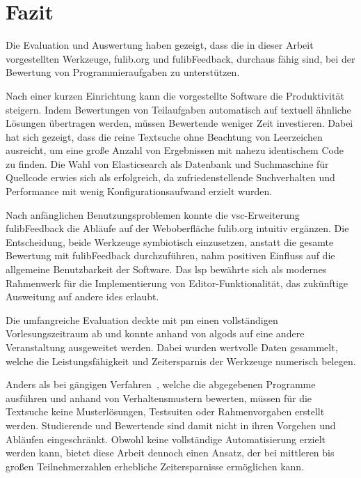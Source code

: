 \chapter{Fazit}\label{ch:conclusion}

Die Evaluation und Auswertung haben gezeigt, dass die in dieser Arbeit vorgestellten Werkzeuge, fulib.org und fulibFeedback, durchaus fähig sind, bei der Bewertung von Programmieraufgaben zu unterstützen.

Nach einer kurzen Einrichtung kann die vorgestellte Software die Produktivität steigern.
Indem Bewertungen von Teilaufgaben automatisch auf textuell ähnliche Lösungen übertragen werden, müssen Bewertende weniger Zeit investieren.
Dabei hat sich gezeigt, dass die reine Textsuche ohne Beachtung von Leerzeichen ausreicht, um eine große Anzahl von Ergebnissen mit nahezu identischem Code zu finden.
Die Wahl von Elasticsearch als Datenbank und Suchmaschine für Quellcode erwies sich als erfolgreich, da zufriedenstellende Suchverhalten und Performance mit wenig Konfigurationsaufwand erzielt wurden.

Nach anfänglichen Benutzungsproblemen konnte die \ac{vsc}-Erweiterung fulibFeedback die Abläufe auf der Weboberfläche fulib.org intuitiv ergänzen.
Die Entscheidung, beide Werkzeuge symbiotisch einzusetzen, anstatt die gesamte Bewertung mit fulibFeedback durchzuführen, nahm positiven Einfluss auf die allgemeine Benutzbarkeit der Software.
Das \acl{lsp} bewährte sich als modernes Rahmenwerk für die Implementierung von Editor-Funktionalität, das zukünftige Ausweitung auf andere \acp{ide} erlaubt.

Die umfangreiche Evaluation deckte mit \ac{pm} einen vollständigen Vorlesungszeitraum ab und konnte anhand von \acl{algods} auf eine andere Veranstaltung ausgeweitet werden.
Dabei wurden wertvolle Daten gesammelt, welche die Leistungsfähigkeit und Zeitersparnis der Werkzeuge numerisch belegen.

Anders als bei gängigen Verfahren~\cite{jackson-1997-assyst,edwards-2008-web-cat,enstroem-et-al-2011,vander-zanden-2012}, welche die abgegebenen Programme ausführen und anhand von Verhaltensmustern bewerten, müssen für die Textsuche keine Musterlösungen, Testsuiten oder Rahmenvorgaben erstellt werden.
Studierende und Bewertende sind damit nicht in ihren Vorgehen und Abläufen eingeschränkt.
Obwohl keine vollständige Automatisierung erzielt werden kann, bietet diese Arbeit dennoch einen Ansatz, der bei mittleren bis großen Teilnehmerzahlen erhebliche Zeitersparnisse ermöglichen kann.
